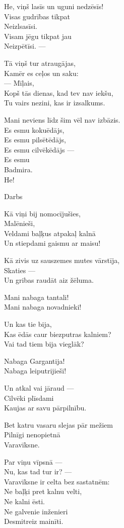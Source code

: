 \documentclass[14pt]{extarticle}
\begin{document}
He, viņš lasīs un uguni nedzēsīs!\\
Visas gudrības tikpat\\
Neizlsasīsi.\\
Visam jēgu tikpat jau\\
Neizpētīsi. ---

Tā viņš tur atraugājas,\\
Kamēr es ceļos un saku:\\
--- Mīļais,\\
Kopš tās dienas, kad tev nav iekšu,\\
Tu vairs nezini, kas ir izsalkums.

Mani neviens līdz šim vēl nav izbāzis.\\
Es esmu kokuēdājs,\\
Es esmu pilsētēdājs,\\
Es esmu cilvēkēdājs ---\\
Es esmu\\
Badmira.\\
He!


\newpage

{\large \sc Darbs}

Kā viņi bij nomocījušies,\\
Malēnieši,\\
Veldami baļķus atpakaļ kalnā\\
Un stiepdami gaismu ar maisu!

Kā zivis uz sauszemes mutes vārstīja,\\
Skaties ---\\
Un gribas raudāt aiz žēluma.

Mani nabaga tantali!\\
Mani nabaga novadnieki!

Un kas tie bija,\\
Kas ēdās caur biezputras kalniem?\\
Vai tad tiem bija vieglāk?

Nabaga Gargantija!\\
Nabaga leiputrijieši!

Un atkal vai jāraud ---\\
Cilvēki plīsdami\\
Kaujas ar savu pārpilnību.

Bet katru vasaru slejas pār mežiem\\
Pilnīgi nenopietnā\\
Varavīksne.

Par viņu vīpsnā ---\\
Nu, kas tad tur ir? ---\\
Varavīksne ir celta bez sastatnēm:\\
Ne baļķi pret kalnu velti,\\
Ne kalni ēsti.\\
Ne galvenie inženieri\\
Desmitreiz mainīti.
\end{document}
